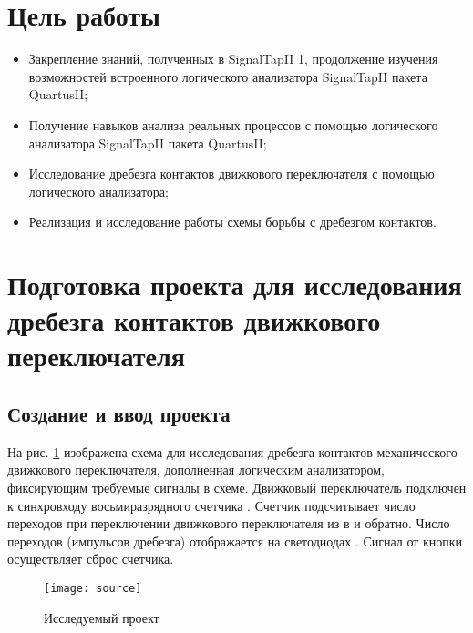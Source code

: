 





\tableofcontents
\listoffigures
\newpage

\section{Цель работы}

\begin{itemize}
	\item Закрепление знаний, полученных в SignalTapII 1, продолжение изучения возможностей встроенного логического анализатора SignalTapII пакета QuartusII;
	\item Получение навыков анализа реальных процессов с помощью логического анализатора SignalTapII пакета QuartusII;
	\item Исследование дребезга контактов движкового переключателя с помощью логического анализатора;
	\item Реализация и исследование работы схемы борьбы с дребезгом контактов.
\end{itemize}

\section{Подготовка проекта для исследования дребезга контактов движкового переключателя}

\subsection{Создание и ввод проекта}

На рис. \ref{fig:source} изображена схема для исследования дребезга контактов механического движкового переключателя, дополненная логическим анализатором, фиксирующим требуемые сигналы в схеме. Движковый переключатель  подключен к синхровходу восьмиразрядного счетчика . Счетчик подсчитывает число переходов  при переключении движкового переключателя из  в  и обратно. Число переходов (импульсов дребезга) отображается на светодиодах . Сигнал от кнопки  осуществляет сброс счетчика.

\begin{figure}[H]
	\begin{center}
		\texttt{[image: source]}
		\caption{Исследуемый проект}
		\label{fig:source}
	\end{center}
\end{figure}
\vspace{-1cm}

